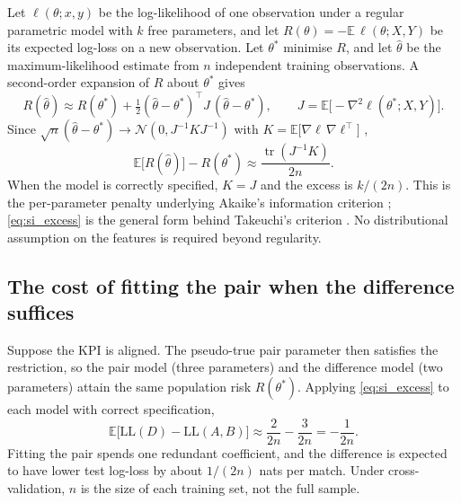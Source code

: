 Let $\ell(\theta;x,y)$ be the log-likelihood of one observation under a regular parametric model with $k$ free parameters, and let $R(\theta)=-\mathbb{E}\,\ell(\theta;X,Y)$ be its expected log-loss on a new observation.
Let $\theta^{*}$ minimise $R$, and let $\hat\theta$ be the maximum-likelihood estimate from $n$ independent training observations.
A second-order expansion of $R$ about $\theta^{*}$ gives
\begin{equation}
  R(\hat\theta)\approx R(\theta^{*})
  +\tfrac12(\hat\theta-\theta^{*})^{\top}J\,(\hat\theta-\theta^{*}),
  \qquad J=\mathbb{E}\bigl[-\nabla^{2}\ell(\theta^{*};X,Y)\bigr].
\end{equation}
Since $\sqrt{n}(\hat\theta-\theta^{*})\to\mathcal{N}(0,J^{-1}KJ^{-1})$ with $K=\mathbb{E}\bigl[\nabla\ell\,\nabla\ell^{\top}\bigr]$ \parencite{white1982},
\begin{equation}
  \mathbb{E}\bigl[R(\hat\theta)\bigr]-R(\theta^{*})
  \approx\frac{\operatorname{tr}(J^{-1}K)}{2n}.
  \label{eq:si_excess}
\end{equation}
When the model is correctly specified, $K=J$ and the excess is $k/(2n)$.
This is the per-parameter penalty underlying Akaike's information criterion \parencite{akaike1973}; \cref{eq:si_excess} is the general form behind Takeuchi's criterion \parencite{konishi2008}.
No distributional assumption on the features is required beyond regularity.

\subsection*{The cost of fitting the pair when the difference suffices}

Suppose the KPI is aligned.
The pseudo-true pair parameter then satisfies the restriction, so the pair model (three parameters) and the difference model (two parameters) attain the same population risk $R(\theta^{*})$.
Applying \cref{eq:si_excess} to each model with correct specification,
\begin{equation}
  \mathbb{E}\bigl[\mathrm{LL}(D)-\mathrm{LL}(A,B)\bigr]
  \approx\frac{2}{2n}-\frac{3}{2n}=-\frac{1}{2n}.
  \label{eq:si_cost}
\end{equation}
Fitting the pair spends one redundant coefficient, and the difference is expected to have lower test log-loss by about $1/(2n)$ nats per match.
Under cross-validation, $n$ is the size of each training set, not the full sample.

